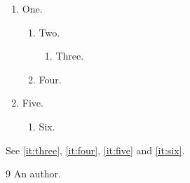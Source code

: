 \documentclass{article}
\begin{document}
\begin{enumerate}
\item One.
\begin{enumerate}
\item Two.
\begin{enumerate}
\item Three.\label{it:three}
\end{enumerate}
\item Four.\label{it:four}
\end{enumerate}
\item Five.\label{it:five}
\begin{enumerate}
\item Six.\label{it:six}
\end{enumerate}
\end{enumerate}
See \cref{it:three}, \cref{it:four}, \cref{it:five} and \cref{it:six}.
\begin{thebibliography}{9}
 An author.\label{bib:k}
\end{thebibliography}
\end{document}
